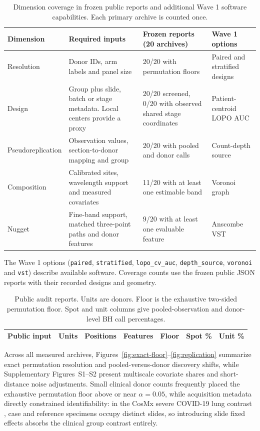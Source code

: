 \documentclass[11pt]{article}
\begin{document}
\begin{table}[htbp]\centering\small
\caption{Dimension coverage in frozen public reports and additional Wave 1 software capabilities. Each primary archive is counted once.}\label{tab:coverage}
\begin{tabularx}{\linewidth}{@{}p{.17\linewidth}X X p{.18\linewidth}@{}}\toprule
Dimension & Required inputs & Frozen reports (20 archives) & Wave 1 options\\\midrule
Resolution & Donor IDs, arm labels and panel size & 20/20 with permutation floors & Paired and stratified designs\\
Design & Group plus slide, batch or stage metadata. Local centers provide a proxy & 20/20 screened, 0/20 with observed shared stage coordinates & Patient-centroid LOPO AUC\\
Pseudoreplication & Observation values, section-to-donor mapping and group & 20/20 with pooled and donor calls & Count-depth source\\
Composition & Calibrated sites, wavelength support and measured covariates & 11/20 with at least one estimable band & Voronoi graph\\
Nugget & Fine-band support, matched three-point paths and donor features & 9/20 with at least one evaluable feature & Anscombe VST\\
\bottomrule\end{tabularx}
\end{table}
The Wave 1 options (\texttt{paired}, \texttt{stratified}, \texttt{lopo\_cv\_auc}, \texttt{depth\_source}, \texttt{voronoi} and \texttt{vst}) describe available software. Coverage counts use the frozen public JSON reports with their recorded designs and geometry.

\begin{table}[htbp]\centering\small
\caption{Public audit reports. Units are donors. Floor is the exhaustive two-sided permutation floor. Spot and unit columns give pooled-observation and donor-level BH call percentages.}\label{tab:cohorts}
\begin{tabular}{lrrrrrr}\toprule
Public input & Units & Positions & Features & Floor & Spot \% & Unit \%\\\midrule

\end{tabular}
\end{table}

Across all \MeasuredArchives{} measured archives, Figures~\ref{fig:exact-floor}--\ref{fig:replication} summarize exact permutation resolution and pooled-versus-donor discovery shifts, while Supplementary Figures~S1--S2 present multiscale covariate shares and short-distance noise adjustments. Small clinical donor counts frequently placed the exhaustive permutation floor above or near $\alpha = 0.05$, while acquisition metadata directly constrained identifiability: in the CosMx severe COVID-19 lung contrast \cite{geo327879}, case and reference specimens occupy distinct slides, so introducing slide fixed effects absorbs the clinical group contrast entirely.
\end{document}
